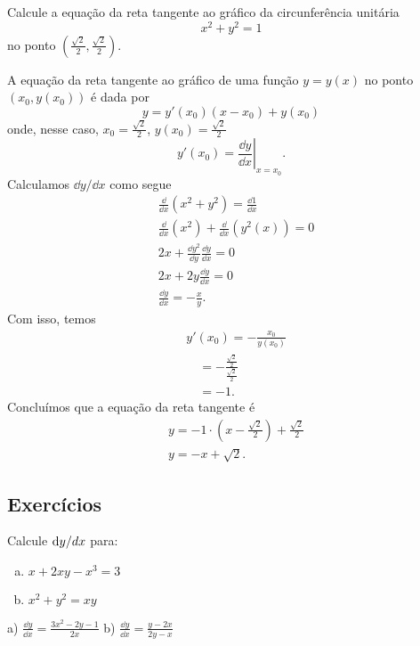 \begin{exeresol}
  Calcule a equação da reta tangente ao gráfico da circunferência unitária
  \begin{equation}
    x^2 + y^2 = 1
  \end{equation}
  no ponto $\displaystyle\left(\frac{\sqrt{2}}{2}, \frac{\sqrt{2}}{2}\right)$.
\end{exeresol}
\begin{resol}
  A equação da reta tangente ao gráfico de uma função $y = y(x)$ no ponto $(x_0, y(x_0))$ é dada por
  \begin{equation}
    y = y'(x_0)(x - x_0) + y(x_0)
  \end{equation}
  onde, nesse caso, $\displaystyle x_0 = \frac{\sqrt{2}}{2}$, $\displaystyle y(x_0) = \frac{\sqrt{2}}{2}$
  \begin{equation}
    y'(x_0) = \left.\frac{\dd y}{\dd x}\right|_{x=x_0}.
  \end{equation}
  Calculamos $\dd y/\dd x$ como segue
  \begin{align}
    & \frac{\dd}{\dd x}\left(x^2+y^2\right) = \frac{\dd 1}{\dd x} \\
    & \frac{\dd}{\dd x}\left(x^2\right) + \frac{\dd}{\dd x}\left(y^2(x)\right) = 0\\
    & 2x + \frac{\dd y^2}{\dd y}\frac{\dd y}{\dd x} = 0\\
    & 2x + 2y\frac{\dd y}{\dd x} = 0\\
    & \frac{\dd y}{\dd x} = -\frac{x}{y}.
  \end{align}
  Com isso, temos
  \begin{align}
    & y'(x_0) = -\frac{x_0}{y(x_0)}\\
    & \text{}\quad = -\frac{\frac{\sqrt{2}}{2}}{\frac{\sqrt{2}}{2}}\\
    & \text{}\quad = -1.
  \end{align}
  Concluímos que a equação da reta tangente é
  \begin{align}
    & y = -1\cdot \left(x - \frac{\sqrt{2}}{2}\right) + \frac{\sqrt{2}}{2}\\
    & y = -x + \sqrt{2}.
  \end{align}
\end{resol}

\subsection{Exercícios}

\begin{exer}
  Calcule $\mathrm{d} y/\\d x$ para:
  \begin{enumerate}[a)]
  \item $x + 2xy - x^3 = 3$
  \item $x^2 + y^2 = xy$
  \end{enumerate}
\end{exer}
\begin{resp}
  a) $\displaystyle \frac{\dd y}{\dd x} = \frac{3x^2 - 2y - 1}{2x}$ b) $\displaystyle \frac{\dd y}{\dd x} = \frac{y - 2x}{2y - x}$
\end{resp}

